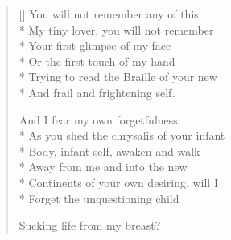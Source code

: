 \label{ch:forelena}
\settowidth{\versewidth}{As you shed the chrysalis of your infant}
\begin{verse}[\versewidth]
You will not remember any of this:\\*
My tiny lover, you will not remember\\*
Your first glimpse of my face\\*
Or the first touch of my hand\\*
Trying to read the Braille of your new\\*
And frail and frightening self.

And I fear my own forgetfulness:\\*
As you shed the chrysalis of your infant\\*
Body, infant self, awaken and walk\\*
Away from me and into the new\\*
Continents of your own desiring, will I\\*
Forget the unquestioning child

Sucking life from my breast?
\end{verse}
